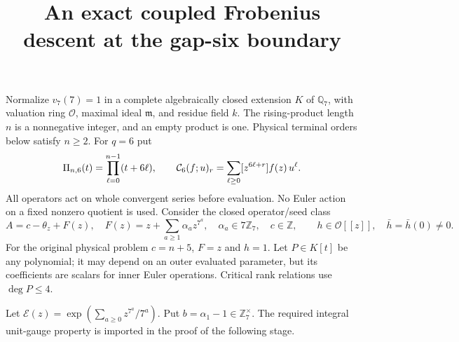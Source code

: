 \documentclass[11pt]{article}
\title{An exact coupled Frobenius descent at the gap-six boundary}
\author{}\date{}
\begin{document}
\setlength{\emergencystretch}{1em}\maketitle
Normalize $v_7(7)=1$ in a complete algebraically closed extension $K$
of $\mathbb Q_7$, with valuation ring $\mathcal O$, maximal ideal $\mathfrak m$, and residue field $k$.
The rising-product length $n$ is a nonnegative integer, and an empty
product is one. Physical terminal orders below satisfy $n\ge2$.
For $q=6$ put
\[
 \Pi_{n,6}(t)=\prod_{\ell=0}^{n-1}(t+6\ell),\qquad
 {\cal C}_6(f;u)_r=\sum_{\ell\ge0}[z^{6\ell+r}]f(z)\,u^\ell .
\]
All operators act on whole convergent series before evaluation.
No Euler action on a fixed nonzero quotient is used.
Consider the closed operator/seed class
\[
 A=c-\theta_z+F(z),\quad
 F(z)=z+\sum_{a\ge1}\alpha_a z^{7^a},\quad
 \alpha_a\in7\mathbb Z_7,\quad c\in\mathbb Z,
 \qquad h\in\mathcal O[[z]],\quad\bar h=\bar h(0)\ne0.
\]
For the original physical problem $c=n+5$, $F=z$ and $h=1$.
Let $P\in K[t]$ be any polynomial; it may depend on an outer
evaluated parameter, but its coefficients are scalars for inner Euler
operations. Critical rank relations use $\deg P\le4$.

Let $\mathcal E(z)=\exp(\sum_{a\ge0}z^{7^a}/7^a)$.
Put $b=\alpha_1-1\in\mathbb Z_7^\times$.
The required integral unit-gauge property is imported in the proof
of the following stage.
\end{document}
